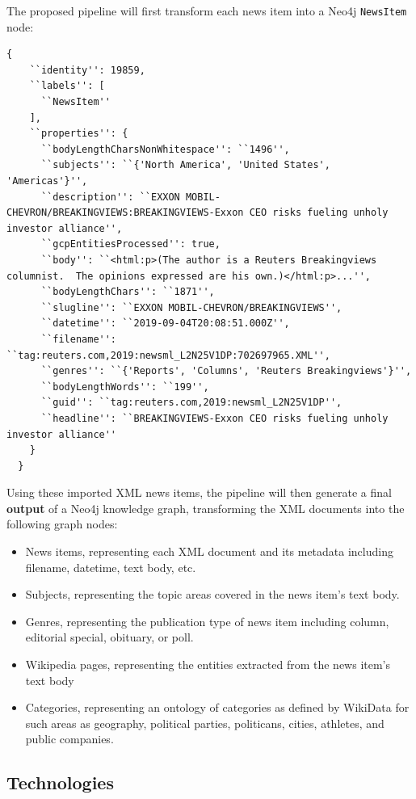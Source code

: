 \documentclass[11pt]{article}
\begin{document}
  The proposed pipeline will first transform each news item into a Neo4j \lstinline{NewsItem} node:

  \begin{lstlisting}[basicstyle=\tiny]
  {
    ``identity'': 19859,
    ``labels'': [
      ``NewsItem''
    ],
    ``properties'': {
      ``bodyLengthCharsNonWhitespace'': ``1496'',
      ``subjects'': ``{'North America', 'United States', 'Americas'}'',
      ``description'': ``EXXON MOBIL-CHEVRON/BREAKINGVIEWS:BREAKINGVIEWS-Exxon CEO risks fueling unholy investor alliance'',
      ``gcpEntitiesProcessed'': true,
      ``body'': ``<html:p>(The author is a Reuters Breakingviews columnist.  The opinions expressed are his own.)</html:p>...'',
      ``bodyLengthChars'': ``1871'',
      ``slugline'': ``EXXON MOBIL-CHEVRON/BREAKINGVIEWS'',
      ``datetime'': ``2019-09-04T20:08:51.000Z'',
      ``filename'': ``tag:reuters.com,2019:newsml_L2N25V1DP:702697965.XML'',
      ``genres'': ``{'Reports', 'Columns', 'Reuters Breakingviews'}'',
      ``bodyLengthWords'': ``199'',
      ``guid'': ``tag:reuters.com,2019:newsml_L2N25V1DP'',
      ``headline'': ``BREAKINGVIEWS-Exxon CEO risks fueling unholy investor alliance''
    }
  }
  \end{lstlisting}

  Using these imported XML news items, the pipeline will then generate a final \textbf{output} of a Neo4j knowledge graph, transforming the XML documents into the following graph nodes:
  \begin{itemize}
    \item{News items, representing each XML document and its metadata including filename, datetime, text body, etc.}
    \item{Subjects, representing the topic areas covered in the news item's text body.}
    \item{Genres, representing the publication type of news item including column, editorial special, obituary, or poll.}
    \item{Wikipedia pages, representing the entities extracted from the news item's text body}
    \item{Categories, representing an ontology of categories as defined by WikiData for such areas as geography, political parties, politicans, cities, athletes, and public companies.}
  \end{itemize}

  \subsection{Technologies}
\end{document}
